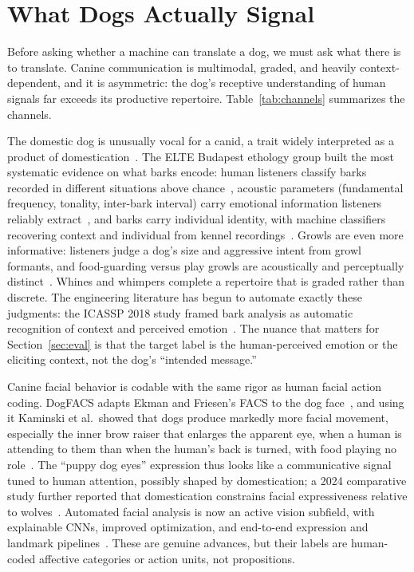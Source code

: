 \section{What Dogs Actually Signal}
\label{sec:biology}

Before asking whether a machine can translate a dog, we must ask what there
is to translate. Canine communication is multimodal, graded, and heavily
context-dependent, and it is asymmetric: the dog's receptive understanding
of human signals far exceeds its productive repertoire.
Table~\ref{tab:channels} summarizes the channels.

The domestic dog is unusually vocal for a canid, a trait widely interpreted
as a product of domestication~\cite{miklosi2007dog}. The ELTE Budapest ethology group built the
most systematic evidence on what barks encode: human listeners classify
barks recorded in different situations above
chance~\cite{pongracz2005barks}, acoustic parameters (fundamental frequency,
tonality, inter-bark interval) carry emotional information listeners
reliably extract~\cite{pongracz2006acoustic}, and barks carry individual
identity, with machine classifiers recovering context and individual from
kennel recordings~\cite{molnar2006discriminate}. Growls are even more
informative: listeners judge a dog's size and aggressive intent from growl
formants, and food-guarding versus play growls are acoustically and
perceptually distinct~\cite{farago2017growls}. Whines and whimpers complete
a repertoire that is graded rather than discrete. The engineering
literature has begun to automate exactly these judgments: the ICASSP 2018
study framed bark analysis as automatic recognition of context and
perceived emotion~\cite{icassp2018dogbark}. The nuance that matters for
Section~\ref{sec:eval} is that the target label is the human-perceived
emotion or the eliciting context, not the dog's ``intended message.''

Canine facial behavior is codable with the same rigor as human facial
action coding. DogFACS adapts Ekman and Friesen's FACS to the dog
face~\cite{waller2013dogfacs}, and using it Kaminski et al.\ showed that
dogs produce markedly more facial movement, especially the inner brow
raiser that enlarges the apparent eye, when a human is attending to them
than when the human's back is turned, with food playing no
role~\cite{kaminski2017attention}. The ``puppy dog eyes'' expression thus
looks like a communicative signal tuned to human attention, possibly shaped
by domestication; a 2024 comparative study further reported that
domestication constrains facial expressiveness relative to
wolves~\cite{sci2024domestication}. Automated facial analysis is now an
active vision subfield, with explainable CNNs, improved optimization, and
end-to-end expression and landmark
pipelines~\cite{sci2022explainable,sci2023cnnewoa,sci2025automated,sci2025landmarks}.
These are genuine advances, but their labels are human-coded affective
categories or action units, not propositions.

